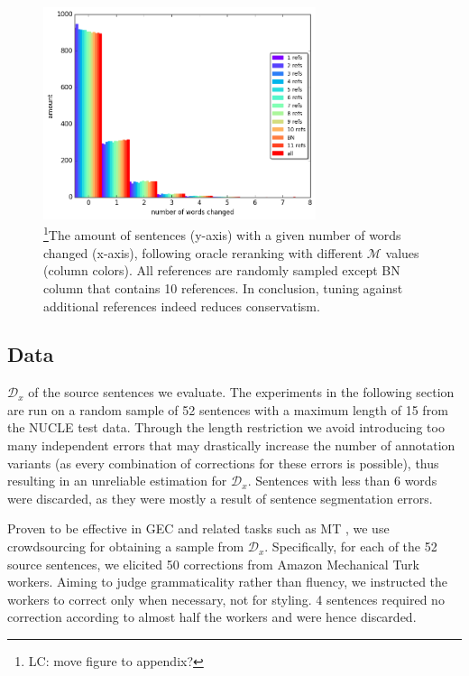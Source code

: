 \documentclass[letterpaper, 11pt]{article}
\newcommand{\lc}[1]{\footnote{\color{blue}LC: #1}}
\begin{document}
\begin{figure}
	\vspace{-1em}
	\includegraphics[width=8cm]{words_differences_hist_reranking}
	\caption{\lc{move figure to appendix?}The amount of sentences (y-axis) with a given number of words changed (x-axis), following oracle reranking with different $\mathcal{M}$ values (column colors). All references are randomly sampled except BN column that contains  10 references.
		In conclusion, tuning against additional references indeed reduces conservatism.
		\label{fig:reranking_word_change}
        }
	\vspace{-0.5cm}
\end{figure}
%
 \subsection{Data}
%
$\mathcal{D}_x$ of the source sentences we evaluate.
The experiments in the following section are run on a random sample of 52 sentences with a maximum length of 15 from the NUCLE test data.
Through the length restriction we avoid introducing too many independent errors that may drastically increase the number of annotation variants (as every combination of corrections for these errors is possible), thus resulting in an unreliable estimation for $\mathcal{D}_x$.
Sentences with less than 6 words were discarded, as they were mostly a result of sentence segmentation errors.

Proven to be effective in GEC \cite{madnani2011they} and related tasks such as MT \cite{zaidan2011crowdsourcing, post2012constructing}, we use crowdsourcing for obtaining a sample from $\mathcal{D}_x$. Specifically, for each of the 52 source sentences, we elicited 50 corrections from Amazon Mechanical Turk workers.
Aiming to judge grammaticality rather than fluency, we instructed the workers to
correct only when necessary, not for styling.
4 sentences required no correction according to almost half the workers and were hence discarded.
%
\end{document}
